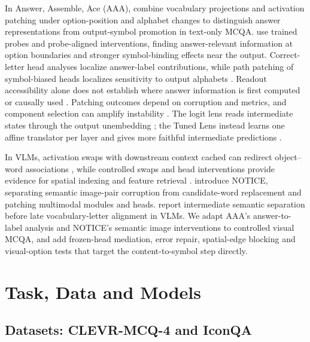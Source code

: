 \documentclass[11pt]{article}
\begin{document}
In Answer, Assemble, Ace (AAA), \citet{wiegreffe2025answerassembleaceunderstanding} combine vocabulary projections and activation patching under option-position and alphabet changes to distinguish answer representations from output-symbol promotion in text-only MCQA. \citet{wong2026decidebind} use trained probes and probe-aligned interventions, finding answer-relevant information at option boundaries and stronger symbol-binding effects near the output. Correct-letter head analyses localize answer-label contributions, while path patching of symbol-biased heads localizes sensitivity to output alphabets \citep{lieberum2023doescircuit,yang2025option}. Readout accessibility alone does not establish where answer information is first computed or causally used \citep{wiegreffe2025answerassembleaceunderstanding,wong2026decidebind}. Patching outcomes depend on corruption and metrics, and component selection can amplify instability \citep{zhang2024patching,heimersheim2024patching,meloux2026statistical}. The logit lens reads intermediate states through the output unembedding \citep{nostalgebraist2020logitlens}; the Tuned Lens instead learns one affine translator per layer and gives more faithful intermediate predictions \citep{belrose2023tunedlens}.

In VLMs, activation swaps with downstream context cached can redirect object--word associations \citep{saravanan2025binding}, while controlled swaps and head interventions provide evidence for spatial indexing and feature retrieval \citep{assouel2026visualsymbolic}. \citet{golovanevsky2025notice} introduce NOTICE, separating semantic image-pair corruption from candidate-word replacement and patching multimodal modules and heads. \citet{palacios2026abstraction} report intermediate semantic separation before late vocabulary-letter alignment in VLMs. We adapt AAA's answer-to-label analysis and NOTICE's semantic image interventions to controlled visual MCQA, and add frozen-head mediation, error repair, spatial-edge blocking and visual-option tests that target the content-to-symbol step directly.

\section{Task, Data and Models}

\subsection{Datasets: CLEVR-MCQ-4 and IconQA}
\end{document}

